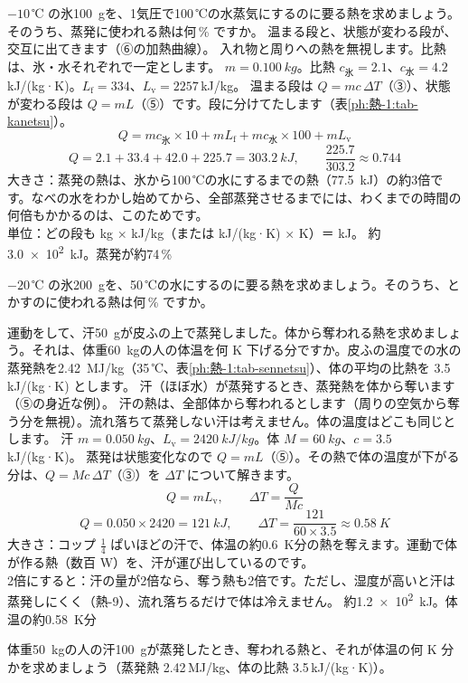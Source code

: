 \label{ph:熱-1:ex6}
\begin{phreidai}[氷を水蒸気にする熱]
$-10$\,℃ の氷\qty{100}{g}を、1気圧で100\,℃の水蒸気にするのに要る熱を求めましょう。そのうち、蒸発に使われる熱は何\,\% ですか。
\phbamen
温まる段と、状態が変わる段が、交互に出てきます（⑥の加熱曲線）。
\phmushi
入れ物と周りへの熱を無視します。比熱は、氷・水それぞれで一定とします。
\phzu
$m=\qty{0.100}{kg}$。比熱 $c_{\text{氷}}=2.1$、$c_{\text{水}}=4.2$\,kJ/(kg·K)。$L_{\mathrm f}=334$、$L_{\mathrm v}=2257$\,kJ/kg。
\phriyu
温まる段は $Q=mc\,\Delta T$（③）、状態が変わる段は $Q=mL$（⑤）です。段に分けてたします（表\ref{ph:熱-1:tab-kanetsu}）。
\phtateru
\[Q=mc_{\text{氷}}\times10+mL_{\mathrm f}+mc_{\text{水}}\times100+mL_{\mathrm v}\]
\phtoku
\[Q=2.1+33.4+42.0+225.7=\qty{303.2}{kJ},\qquad \frac{225.7}{303.2}\approx0.744\]
\phtashikame
大きさ：蒸発の熱は、氷から100\,℃の水にするまでの熱（\qty{77.5}{kJ}）の約3倍です。なべの水をわかし始めてから、全部蒸発させるまでには、わくまでの時間の何倍もかかるのは、このためです。\\
単位：どの段も kg × kJ/kg（または kJ/(kg·K) × K）＝ kJ。
\kotae 約\qty{3.0e2}{kJ}。蒸発が約74\,\%
\end{phreidai}
\begin{jibun}
$-20$\,℃ の氷\qty{200}{g}を、50\,℃の水にするのに要る熱を求めましょう。そのうち、とかすのに使われる熱は何\,\% ですか。
\end{jibun}

\label{ph:熱-1:ex7}
\begin{phreidai}[汗で体はどれだけ冷える？]
運動をして、汗\qty{50}{g}が皮ふの上で蒸発しました。体から奪われる熱を求めましょう。それは、体重\qty{60}{kg}の人の体温を何 K 下げる分ですか。皮ふの温度での水の蒸発熱を\qty{2.42}{MJ/kg}（35\,℃、表\ref{ph:熱-1:tab-sennetsu}）、体の平均の比熱を 3.5\,kJ/(kg·K) とします。
\phbamen
汗（ほぼ水）が蒸発するとき、蒸発熱を体から奪います（⑤の身近な例）。
\phmushi
汗の熱は、全部体から奪われるとします（周りの空気から奪う分を無視）。流れ落ちて蒸発しない汗は考えません。体の温度はどこも同じとします。
\phzu
汗 $m=\qty{0.050}{kg}$、$L_{\mathrm v}=\qty{2420}{kJ/kg}$。体 $M=\qty{60}{kg}$、$c=3.5$\,kJ/(kg·K)。
\phriyu
蒸発は状態変化なので $Q=mL$（⑤）。その熱で体の温度が下がる分は、$Q=Mc\,\Delta T$（③）を $\Delta T$ について解きます。
\phtateru
\[Q=mL_{\mathrm v},\qquad \Delta T=\frac{Q}{Mc}\]
\phtoku
\[Q=0.050\times2420=\qty{121}{kJ},\qquad \Delta T=\frac{121}{60\times3.5}\approx\qty{0.58}{K}\]
\phtashikame
大きさ：コップ $\tfrac{1}{4}$ ぱいほどの汗で、体温の約\qty{0.6}{K}分の熱を奪えます。運動で体が作る熱（数百 W）を、汗が運び出しているのです。\\
2倍にすると：汗の量が2倍なら、奪う熱も2倍です。ただし、湿度が高いと汗は蒸発しにくく（熱-9）、流れ落ちるだけで体は冷えません。
\kotae 約\qty{1.2e2}{kJ}。体温の約\qty{0.58}{K}分
\end{phreidai}
\begin{jibun}
体重\qty{50}{kg}の人の汗\qty{100}{g}が蒸発したとき、奪われる熱と、それが体温の何 K 分かを求めましょう（蒸発熱 2.42\,MJ/kg、体の比熱 3.5\,kJ/(kg·K)）。
\end{jibun}

